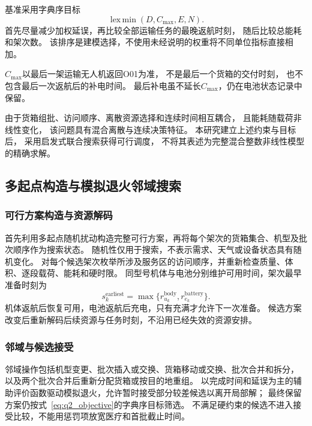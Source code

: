 \documentclass[bwprint]{gmcmthesis}
\begin{document}
基准采用字典序目标
\begin{equation}
    \operatorname{lex\,min}
    \left(D,C_{\max},E,N\right).
    \label{eq:q2_objective}
\end{equation}
首先尽量减少加权延误，再比较全部运输任务的最晚返航时刻，
随后比较总能耗和架次数。
该排序是建模选择，不使用未经说明的权重将不同单位指标直接相加。

$C_{\max}$以最后一架运输无人机返回O01为准，
不是最后一个货箱的交付时刻，
也不包含最后一次返航后的补电时间。
最后补电虽不延长$C_{\max}$，仍在电池状态记录中保留。

由于货箱组批、访问顺序、离散资源选择和连续时间相互耦合，
且能耗随载荷非线性变化，
该问题具有混合离散与连续决策特征。
本研究建立上述约束与目标后，
采用启发式联合搜索获得可行调度，
不将其表述为完整混合整数非线性模型的精确求解。

\subsection{多起点构造与模拟退火邻域搜索}
\subsubsection{可行方案构造与资源解码}
首先利用多起点随机扰动构造完整可行方案，再将每个架次的货箱集合、机型及批次顺序作为搜索状态。
随机性仅用于搜索，不表示需求、天气或设备状态具有随机变化。
对每个候选架次枚举所涉及服务区的访问顺序，并重新检查质量、体积、逐段载荷、能耗和硬时限。
同型号机体与电池分别维护可用时间，架次最早准备时刻为
\begin{equation}
s_k^{\mathrm{earliest}}=\max\{r_{u_k}^{\mathrm{body}},r_{e_k}^{\mathrm{battery}}\}.
\end{equation}
机体返航后恢复可用，电池返航后充电，只有充满才允许下一次准备。
候选方案改变后重新解码后续资源与任务时刻，不沿用已经失效的资源安排。

\subsubsection{邻域与候选接受}
邻域操作包括机型变更、批次插入或交换、货箱移动或交换、批次合并和拆分，
以及两个批次合并后重新分配货箱或按目的地重组。
以完成时间和延误为主的辅助评价函数驱动模拟退火，允许暂时接受部分较差候选以离开局部解；
最终保留方案仍按式~\eqref{eq:q2_objective}的字典序目标筛选。
不满足硬约束的候选不进入接受比较，不能用惩罚项放宽医疗和首批截止时间。
\end{document}
